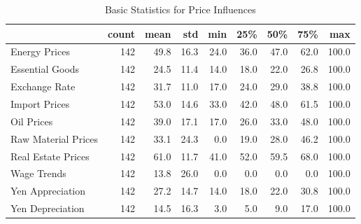 \documentclass[a4paper,12pt]{article}
\begin{document}
        
        \begin{landscape}
        \begin{table}
\caption{Basic Statistics for Price Influences}
\label{tab:statistics_Price_Influences}
\begin{tabular}{lrrrrrrrr}
\toprule
 & count & mean & std & min & 25\% & 50\% & 75\% & max \\
\midrule
Energy Prices & 142 & 49.8 & 16.3 & 24.0 & 36.0 & 47.0 & 62.0 & 100.0 \\
Essential Goods & 142 & 24.5 & 11.4 & 14.0 & 18.0 & 22.0 & 26.8 & 100.0 \\
Exchange Rate & 142 & 31.7 & 11.0 & 17.0 & 24.0 & 29.0 & 38.8 & 100.0 \\
Import Prices & 142 & 53.0 & 14.6 & 33.0 & 42.0 & 48.0 & 61.5 & 100.0 \\
Oil Prices & 142 & 39.0 & 17.1 & 17.0 & 26.0 & 33.0 & 48.0 & 100.0 \\
Raw Material Prices & 142 & 33.1 & 24.3 & 0.0 & 19.0 & 28.0 & 46.2 & 100.0 \\
Real Estate Prices & 142 & 61.0 & 11.7 & 41.0 & 52.0 & 59.5 & 68.0 & 100.0 \\
Wage Trends & 142 & 13.8 & 26.0 & 0.0 & 0.0 & 0.0 & 0.0 & 100.0 \\
Yen Appreciation & 142 & 27.2 & 14.7 & 14.0 & 18.0 & 22.0 & 30.8 & 100.0 \\
Yen Depreciation & 142 & 14.5 & 16.3 & 3.0 & 5.0 & 9.0 & 17.0 & 100.0 \\
\bottomrule
\end{tabular}
\end{table}

        \end{landscape}
        
        
\end{document}
